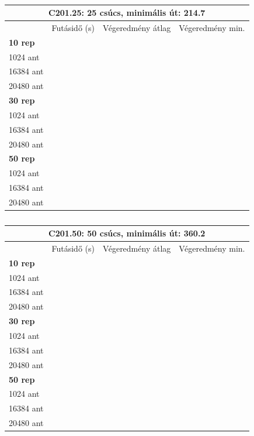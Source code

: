 \begin{table}[ht!]
	\centering
	\begin{tabular}{|p{2cm}||p{3cm}|p{3.5cm}|p{3.5cm}|}
		\hline
		\multicolumn{4}{|c|}{C201.25: 25 csúcs, minimális út: 214.7} \\
		\hline
		& Futásidő (s) & Végeredmény átlag & Végeredmény min.\\
		\hline
		\textbf{10 rep} & & & \\
		1024 ant &  &  &  \\
		16384 ant &  &  &  \\
		20480 ant &  &  &  \\
		\hline
		\textbf{30 rep} &  &  &  \\
		1024 ant &  &  &  \\
		16384 ant &  &  &  \\
		20480 ant &  &  & \\
		\hline
		\textbf{50 rep} &  &  &  \\
		1024 ant &  &  &  \\
		16384 ant &  &  &  \\
		20480 ant &  &  &  \\
		\hline
	\end{tabular}
	\caption{}
	\label{table:VRTPW_25_2}
\end{table}

\begin{table}[ht!]
	\centering
	\begin{tabular}{|p{2cm}||p{3cm}|p{3.5cm}|p{3.5cm}|}
		\hline
		\multicolumn{4}{|c|}{C201.50: 50 csúcs, minimális út: 360.2} \\
		\hline
		& Futásidő (s) & Végeredmény átlag & Végeredmény min.\\
		\hline
		\textbf{10 rep} & & & \\
		1024 ant &  &  &  \\
		16384 ant &  &  &  \\
		20480 ant &  &  &  \\
		\hline
		\textbf{30 rep} &  &  &  \\
		1024 ant &  &  &  \\
		16384 ant & &  &  \\
		20480 ant &  &  & \\
		\hline
		\textbf{50 rep} &  &  &  \\
		1024 ant &  &  &  \\
		16384 ant &  &  &  \\
		20480 ant &  &  &  \\
		\hline
	\end{tabular}
	\caption{}
	\label{table:VRTPW_50_2}
\end{table}

